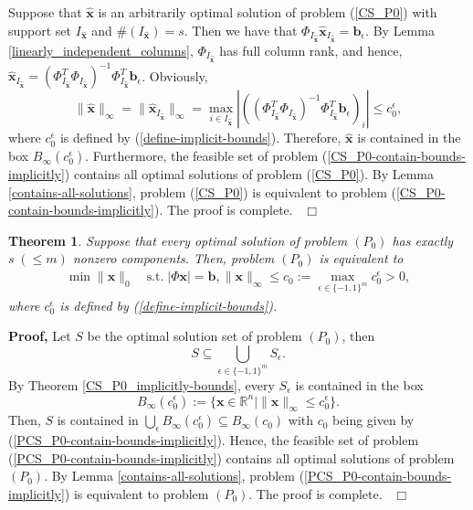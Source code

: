 \documentclass[12pt]{article}
\newtheorem{Theorem}{Theorem}[part]
\def \ep{\hbox{ }\hfill$\Box$}
\begin{document}
Suppose that $\hat{\mathbf{x}}$ is an arbitrarily optimal solution of problem (\ref{CS_P0}) with support set $I_{\hat{\mathbf{x}}}$ and $\#(I_{\hat{\mathbf{x}}})=s$. Then we have that
$\Phi_{I_{\hat{\mathbf{x}}}}\hat{\mathbf{x}}_{I_{\hat{\mathbf{x}}}}=\mathbf{b}_\epsilon$.
By Lemma \ref{linearly_independent_columns},
$\Phi_{I_{\hat{\mathbf{x}}}}$ has full column rank, and hence,
$\hat{\mathbf{x}}_{I_{\hat{\mathbf{x}}}}=(\Phi^{T}_{I_{\hat{\mathbf{x}}}}\Phi_{I_{\hat{\mathbf{x}}}})^{-1}\Phi^{T}_{I_{\hat{\mathbf{x}}}}\mathbf{b}_\epsilon$.
Obviously,
$$\|\hat{\mathbf{x}}\|_\infty=\|\hat{\mathbf{x}}_{I_{\hat{\mathbf{x}}}}\|_\infty
=\max\limits_{i\in
I_{\hat{\mathbf{x}}}}|((\Phi^{T}_{I_{\hat{\mathbf{x}}}}\Phi_{I_{\hat{\mathbf{x}}}})^{-1}\Phi^{T}_{I_{\hat{\mathbf{x}}}}\mathbf{b}_\epsilon)_i|\leqslant
c^\epsilon_0,$$ where $c^\epsilon_0$ is defined by
(\ref{define-implicit-bounds}). Therefore, $\hat{\mathbf{x}}$ is
contained in the box $B_\infty(c^\epsilon_0)$. Furthermore, the
feasible set of problem (\ref{CS_P0-contain-bounds-implicitly}) contains all
optimal solutions of problem (\ref{CS_P0}). By Lemma
\ref{contains-all-solutions}, problem (\ref{CS_P0}) is equivalent to problem
(\ref{CS_P0-contain-bounds-implicitly}). The proof is complete.
\ep

\begin{Theorem}\label{PCS-implicitly-has-bounds}
Suppose that every optimal solution of problem $(P_0)$  has exactly $s\;(\leqslant m)$ nonzero components. Then, problem $(P_0)$ is equivalent to
\begin{eqnarray}\label{PCS_P0-contain-bounds-implicitly}
\min \|\mathbf{x}\|_0\quad \textrm{s.t.}\;|\Phi\mathbf{x}|=\mathbf{b}, \|\mathbf{x}\|_{\infty}\leqslant c_0:=\max\limits_{\epsilon\in\{-1,1\}^m}c^\epsilon_0>0,
\end{eqnarray}
where $c^\epsilon_0$ is defined by (\ref{define-implicit-bounds}).
\end{Theorem}

{\bf Proof,}
Let $S$  be the optimal solution set of problem $(P_0)$, then
$$
S\subseteq \bigcup\limits_{\epsilon\in\{-1,1\}^m} S_\epsilon.
$$
By Theorem \ref{CS_P0_implicitly-bounds}, every $S_\epsilon$ is contained in the box $$
B_\infty(c^\epsilon_0):=\{\mathbf{x}\in \mathbb{R}^n \mid \|\mathbf{x}\|_{\infty}\leqslant c^\epsilon_0\}.
$$
Then, $S$ is contained in $\bigcup_\epsilon B_\infty(c^\epsilon_0)\subseteq B_\infty(c_0)$ with $c_0$ being given by (\ref{PCS_P0-contain-bounds-implicitly}). Hence, the feasible set of problem (\ref{PCS_P0-contain-bounds-implicitly}) contains all optimal solutions of problem $(P_0)$. By Lemma \ref{contains-all-solutions}, problem (\ref{PCS_P0-contain-bounds-implicitly}) is equivalent to problem $(P_0)$. The proof is complete.
\ep
\end{document}
